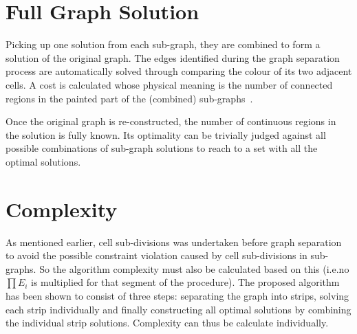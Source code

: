 \documentclass[conference]{IEEEtran}
\begin{document}
\section{Full Graph Solution}\label{section_full_graph}
Picking up one solution from each sub-graph, they are combined to form a solution of the original graph. 
The edges identified during the graph separation process are automatically solved through comparing the colour of its two adjacent cells. 
A cost is calculated whose physical meaning is the number of connected regions in the painted part of the (combined) sub-graphs~\cite{Yang2020Cellular}. 

Once the original graph is re-constructed, the number of continuous regions in the solution is fully known. Its optimality can be trivially judged against all possible combinations of sub-graph solutions to reach to a set with all the optimal solutions. 

\section{Complexity}
\label{section_complexity}
As mentioned earlier, cell sub-divisions was undertaken before graph separation to avoid the possible  constraint violation caused by cell sub-divisions in sub-graphs. So the algorithm complexity must also be calculated based on this (i.e.no $\prod E_i$ is multiplied for that segment of the procedure).
The proposed algorithm has been shown to consist of three steps: separating the graph into strips, solving each strip individually and finally constructing all optimal solutions by combining the individual strip solutions. Complexity can thus be calculate individually. 
\end{document}
